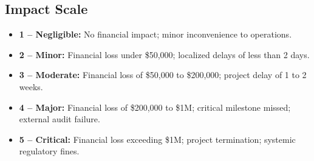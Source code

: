 \subsection{Impact Scale}
\begin{itemize}[label=\textbullet]
  \item \textbf{1 -- Negligible:} No financial impact; minor inconvenience to operations.
  \item \textbf{2 -- Minor:} Financial loss under \$50,000; localized delays of less than 2 days.
  \item \textbf{3 -- Moderate:} Financial loss of \$50,000 to \$200,000; project delay of 1 to 2 weeks.
  \item \textbf{4 -- Major:} Financial loss of \$200,000 to \$1M; critical milestone missed; external audit failure.
  \item \textbf{5 -- Critical:} Financial loss exceeding \$1M; project termination; systemic regulatory fines.
\end{itemize}
